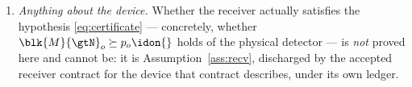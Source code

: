 \begin{remark}
\begin{enumerate}[label=(\alph*),leftmargin=2.4em]
  framework records that the analogous restriction ``cannot be
  straightforwardly used with the postselection technique''
  (\cite[Rem.~9.4]{tupkary2026decoy}). A module importing $\CList$ into a
  different technique must re-establish the licence there; the artefact names
  the technique the licence was issued for
  (Requirement~\ref{req:licence-record}).
\item \emph{Anything about the device.} Whether the receiver actually satisfies
  the hypothesis \eqref{eq:certificate} --- concretely, whether
  $\blk{M}{\gtN}_o\succeq p_o\idon{}$ holds of the physical detector --- is
  \emph{not} proved here and cannot be: it is
  Assumption~\ref{ass:recv}, discharged by the accepted receiver contract for
  the device that contract describes, under its own ledger.
\end{enumerate}
\end{remark}
